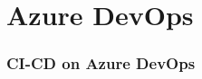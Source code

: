 \setcounter{section}{0}
\part{Azure DevOps}\label{sec:azureDevOps}

\section{CI-CD on Azure DevOps}


\newpage